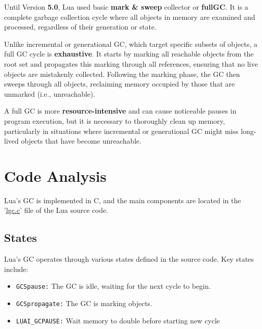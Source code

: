 \documentclass[11pt,paper=a4,answers]{exam}
\begin{document}
\noindent
Until Version \textbf{5.0}, Lua used basic \textbf{mark \& sweep} collector or \textbf{fullGC}. It is a complete garbage collection cycle where all objects in memory are examined and processed, regardless of their generation or state.

\vspace{1mm}
\noindent 
Unlike incremental or generational GC, which target specific subsets of objects, a full GC cycle is \textbf{exhaustive}. It starts by marking all reachable objects from the root set and propagates this marking through all references, ensuring that no live objects are mistakenly collected. Following the marking phase, the GC then sweeps through all objects, reclaiming memory occupied by those that are unmarked (i.e., unreachable).

\vspace{1mm}
\noindent 
A full GC is more \textbf{resource-intensive} and can cause noticeable pauses in program execution, but it is necessary to thoroughly clean up memory, particularly in situations where incremental or generational GC might miss long-lived objects that have become unreachable.

\section{Code Analysis}
Lua's GC is implemented in C, and the main components are located in the '\href{https://www.lua.org/source/5.4/lgc.c.html}{lgc.c}' file of the Lua source code.

\subsection{States}
Lua's GC operates through various states defined in the source code. Key states include:
\begin{itemize}
    \item \verb|GCSpause:| The GC is idle, waiting for the next cycle to begin.
    \item \verb|GCSpropagate:| The GC is marking objects.
    \item \verb|LUAI_GCPAUSE:| Wait memory to double before starting new cycle
\end{itemize}
\end{document}
